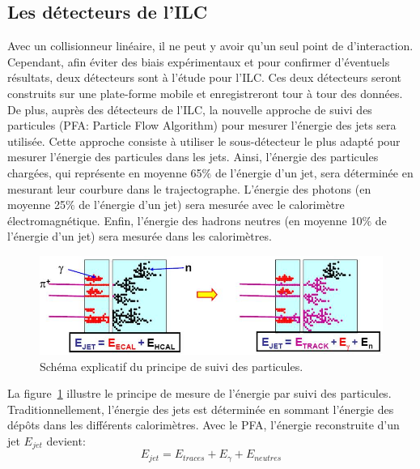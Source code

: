 \subsection{Les détecteurs de l'ILC}
Avec un collisionneur linéaire, il ne peut y avoir qu'un seul point de d'interaction. Cependant, afin éviter des biais expérimentaux et pour confirmer d'éventuels résultats, deux détecteurs sont à l'étude pour l'ILC. Ces deux détecteurs seront construits sur une plate-forme mobile et enregistreront tour à tour des données. De plus, auprès des détecteurs de l'ILC, la nouvelle approche de suivi des particules (PFA: Particle Flow Algorithm) pour mesurer l'énergie des jets sera utilisée. Cette approche consiste à utiliser le sous-détecteur le plus adapté pour mesurer l'énergie des particules dans les jets. Ainsi, l'énergie des particules chargées, qui représente en moyenne 65$\%$ de l'énergie d'un jet, sera déterminée en mesurant leur courbure dans le trajectographe. L'énergie des photons (en moyenne 25$\%$ de l'énergie d'un jet) sera mesurée avec le calorimètre électromagnétique. Enfin, l'énergie des hadrons neutres (en moyenne 10$\%$ de l'énergie d'un jet) sera mesurée dans les calorimètres. 
\begin{figure}[!h]
  \begin{center}
    \includegraphics[width=1.0\textwidth]{ILC/figs/Particle_Flow_Paradigm.jpg}
    \caption{Schéma explicatif du principe de suivi des particules.}
    \label{fig:pfa-scheme}
  \end{center}
\end{figure}
La figure~\ref{fig:pfa-scheme} illustre le principe de mesure de l'énergie par suivi des particules. Traditionnellement, l'énergie des jets est déterminée en sommant l'énergie des dépôts dans les différents calorimètres. Avec le PFA, l'énergie reconstruite d'un jet $E_{jet}$ devient:
\begin{equation}
  E_{jet}=E_{traces}+E_{\gamma}+E_{neutres}
\end{equation}
